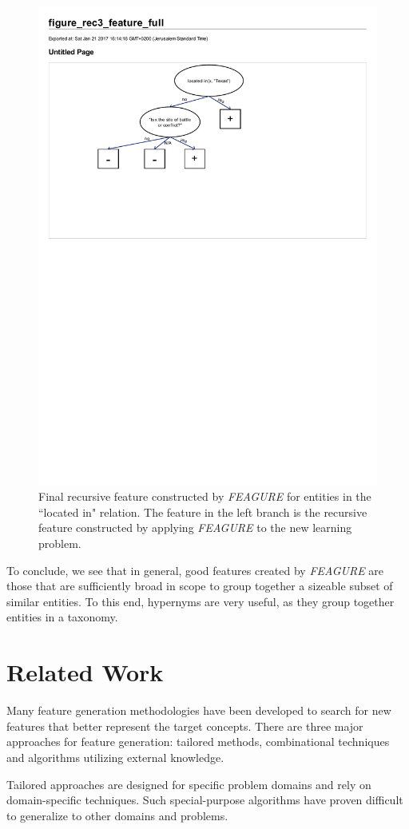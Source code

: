 \documentclass[twoside,11pt]{article}
\theoremstyle{definition}
\begin{document}
\begin{figure}[!h]
	\centering
	\includegraphics[width=0.6\linewidth]{figure_rec3_feature_full}
	\caption{Final recursive feature constructed by \emph{FEAGURE} for entities in the ``located in" relation. The feature in the left branch is the recursive feature constructed by applying \emph{FEAGURE} to the new learning problem.}
	\label{fig:figure_rec3_feature_full}
\end{figure}

To conclude, we see that in general, good features created by \emph{FEAGURE} are those that are sufficiently broad in scope to group together a sizeable subset of similar entities. To this end, hypernyms are very useful, as they group together entities in a taxonomy. 

\section{Related Work}

Many feature generation methodologies have been developed to search for new features that better represent the target concepts. There are three major approaches for feature generation: tailored methods, combinational techniques and algorithms utilizing external knowledge.

Tailored approaches \cite{sutton1991learning,hirsh1994bootstrapping} are designed for specific problem domains and rely on domain-specific techniques. %
Such special-purpose algorithms %
 have proven difficult to generalize to other domains and problems.
\end{document}
